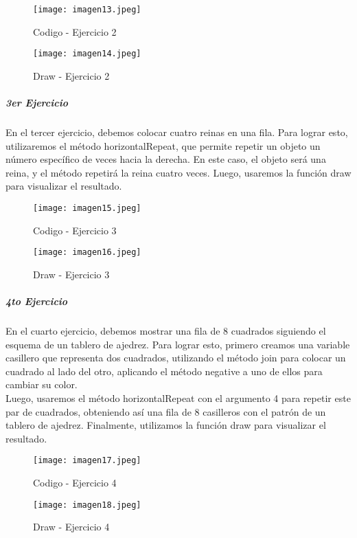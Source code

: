 \documentclass[10pt, a4paper]{article}
\begin{document}
		\begin{figure}[h]
			\centering
			\texttt{[image: imagen13.jpeg]}
			\caption{Codigo - Ejercicio 2}
		\end{figure}
		\begin{figure}[h]
			\centering
			\texttt{[image: imagen14.jpeg]}
			\caption{Draw - Ejercicio 2}
		\end{figure} 
	\subparagraph*{3er Ejercicio}
		\begin{flushleft}
			En el tercer ejercicio, debemos colocar cuatro reinas en una fila. Para lograr esto, utilizaremos el método horizontalRepeat, que permite repetir un objeto un número específico de veces hacia la derecha. En este caso, el objeto será una reina, y el método repetirá la reina cuatro veces. Luego, usaremos la función draw para visualizar el resultado.
		\end{flushleft}
		\begin{figure}[h]
			\centering
			\texttt{[image: imagen15.jpeg]}
			\caption{Codigo - Ejercicio 3}
		\end{figure}
		\begin{figure}[h]
			\centering
			\texttt{[image: imagen16.jpeg]}
			\caption{Draw - Ejercicio 3}
		\end{figure} 
		\vspace*{11cm}
	\subparagraph*{4to Ejercicio}
		\begin{flushleft}
			En el cuarto ejercicio, debemos mostrar una fila de 8 cuadrados siguiendo el esquema de un tablero de ajedrez. Para lograr esto, primero creamos una variable casillero que representa dos cuadrados, utilizando el método join para colocar un cuadrado al lado del otro, aplicando el método negative a uno de ellos para cambiar su color. \\
			Luego, usaremos el método horizontalRepeat con el argumento 4 para repetir este par de cuadrados, obteniendo así una fila de 8 casilleros con el patrón de un tablero de ajedrez. Finalmente, utilizamos la función draw para visualizar el resultado.
		\end{flushleft}
		\begin{figure}[h]
			\centering
			\texttt{[image: imagen17.jpeg]}
			\caption{Codigo - Ejercicio 4}
		\end{figure}
		\begin{figure}[h]
			\centering
			\texttt{[image: imagen18.jpeg]}
			\caption{Draw - Ejercicio 4}
		\end{figure} 
		\vspace*{11cm}
\end{document}
